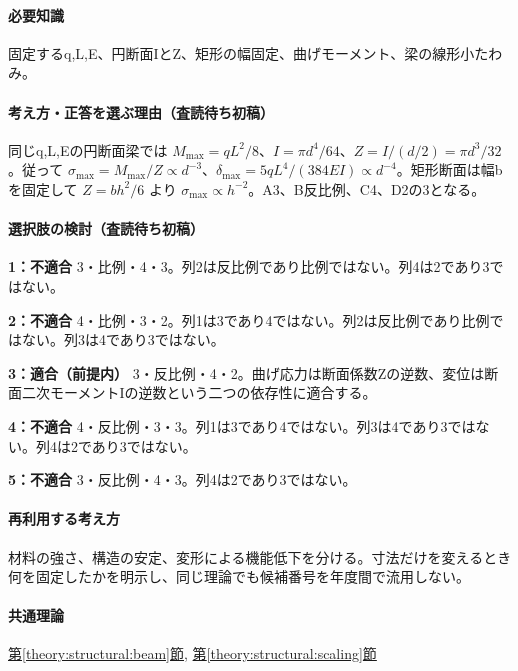 \paragraph{必要知識} 固定するq,L,E、円断面IとZ、矩形の幅固定、曲げモーメント、梁の線形小たわみ。

\paragraph{考え方・正答を選ぶ理由（査読待ち初稿）} 同じq,L,Eの円断面梁では \(M_{\max}=qL^2/8\)、\(I=\pi d^4/64\)、\(Z=I/(d/2)=\pi d^3/32\)。従って \(\sigma_{\max}=M_{\max}/Z\propto d^{-3}\)、\(\delta_{\max}=5qL^4/(384EI)\propto d^{-4}\)。矩形断面は幅bを固定して \(Z=bh^2/6\) より \(\sigma_{\max}\propto h^{-2}\)。A3、B反比例、C4、D2の3となる。

\paragraph{選択肢の検討（査読待ち初稿）}\mbox{}\par

\noindent\textbf{1：不適合} 3・比例・4・3。列2は反比例であり比例ではない。列4は2であり3ではない。\par

\noindent\textbf{2：不適合} 4・比例・3・2。列1は3であり4ではない。列2は反比例であり比例ではない。列3は4であり3ではない。\par

\noindent\textbf{3：適合（前提内）} 3・反比例・4・2。曲げ応力は断面係数Zの逆数、変位は断面二次モーメントIの逆数という二つの依存性に適合する。\par

\noindent\textbf{4：不適合} 4・反比例・3・3。列1は3であり4ではない。列3は4であり3ではない。列4は2であり3ではない。\par

\noindent\textbf{5：不適合} 3・反比例・4・3。列4は2であり3ではない。\par

\paragraph{再利用する考え方} 材料の強さ、構造の安定、変形による機能低下を分ける。寸法だけを変えるとき何を固定したかを明示し、同じ理論でも候補番号を年度間で流用しない。

\paragraph{共通理論} \hyperref[theory:structural:beam]{第\ref*{theory:structural:beam}節}, \hyperref[theory:structural:scaling]{第\ref*{theory:structural:scaling}節}

